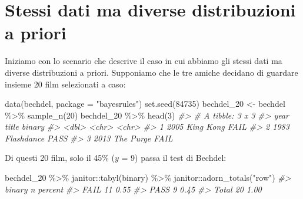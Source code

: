 \documentclass[
  11pt,
]{krantz}
\makeatletter
\newenvironment{Shaded}{\begin{snugshade}}{\end{snugshade}}
\newcommand{\AttributeTok}[1]{\textcolor[rgb]{0.61,0.61,0.61}{#1}}
\newcommand{\CommentTok}[1]{\textcolor[rgb]{0.37,0.37,0.37}{\textit{#1}}}
\newcommand{\DecValTok}[1]{\textcolor[rgb]{0.06,0.06,0.06}{#1}}
\newcommand{\FunctionTok}[1]{\textcolor[rgb]{0,0,0}{#1}}
\newcommand{\NormalTok}[1]{#1}
\newcommand{\OtherTok}[1]{\textcolor[rgb]{0.37,0.37,0.37}{#1}}
\newcommand{\SpecialCharTok}[1]{\textcolor[rgb]{0,0,0}{#1}}
\newcommand{\StringTok}[1]{\textcolor[rgb]{0.5,0.5,0.5}{#1}}
\newenvironment{kframe}{%
\medskip{}
\setlength{\fboxsep}{.8em}
 \def\at@end@of@kframe{}%
 \ifinner\ifhmode%
  \def\at@end@of@kframe{\end{minipage}}%
  \begin{minipage}{\columnwidth}%
 \fi\fi%
 \def\FrameCommand##1{\hskip\@totalleftmargin \hskip-\fboxsep
 \colorbox{shadecolor}{##1}\hskip-\fboxsep
     \hskip-\linewidth \hskip-\@totalleftmargin \hskip\columnwidth}%
 \MakeFramed {\advance\hsize-\width
   \@totalleftmargin\z@ \linewidth\hsize
   \@setminipage}}%
 {\par\unskip\endMakeFramed%
 \at@end@of@kframe}
\renewenvironment{Shaded}{\begin{kframe}}{\end{kframe}}
\theoremstyle{definition}
\theoremstyle{definition}
\theoremstyle{definition}
\theoremstyle{definition}
\theoremstyle{remark}
\makeatother
\begin{document}
\hypertarget{stessi-dati-ma-diverse-distribuzioni-a-priori}{%
\section{Stessi dati ma diverse distribuzioni a priori}\label{stessi-dati-ma-diverse-distribuzioni-a-priori}}

Iniziamo con lo scenario che descrive il caso in cui abbiamo gli stessi dati ma diverse distribuzioni a priori. Supponiamo che le tre amiche decidano di guardare insieme 20 film selezionati a caso:

\begin{Shaded}
\begin{Highlighting}[]
\FunctionTok{data}\NormalTok{(bechdel, }\AttributeTok{package =} \StringTok{"bayesrules"}\NormalTok{)}
\FunctionTok{set.seed}\NormalTok{(}\DecValTok{84735}\NormalTok{)}
\NormalTok{bechdel\_20 }\OtherTok{\textless{}{-}}\NormalTok{ bechdel }\SpecialCharTok{\%\textgreater{}\%} 
  \FunctionTok{sample\_n}\NormalTok{(}\DecValTok{20}\NormalTok{)}
\NormalTok{bechdel\_20 }\SpecialCharTok{\%\textgreater{}\%} 
  \FunctionTok{head}\NormalTok{(}\DecValTok{3}\NormalTok{)}
\CommentTok{\#\textgreater{} \# A tibble: 3 x 3}
\CommentTok{\#\textgreater{}    year title      binary}
\CommentTok{\#\textgreater{}   \textless{}dbl\textgreater{} \textless{}chr\textgreater{}      \textless{}chr\textgreater{} }
\CommentTok{\#\textgreater{} 1  2005 King Kong  FAIL  }
\CommentTok{\#\textgreater{} 2  1983 Flashdance PASS  }
\CommentTok{\#\textgreater{} 3  2013 The Purge  FAIL}
\end{Highlighting}
\end{Shaded}

\noindent Di questi 20 film, solo il 45\% (\(y\) = 9) passa il test di Bechdel:

\begin{Shaded}
\begin{Highlighting}[]
\NormalTok{bechdel\_20 }\SpecialCharTok{\%\textgreater{}\%} 
\NormalTok{  janitor}\SpecialCharTok{::}\FunctionTok{tabyl}\NormalTok{(binary) }\SpecialCharTok{\%\textgreater{}\%} 
\NormalTok{  janitor}\SpecialCharTok{::}\FunctionTok{adorn\_totals}\NormalTok{(}\StringTok{"row"}\NormalTok{)}
\CommentTok{\#\textgreater{}  binary  n percent}
\CommentTok{\#\textgreater{}    FAIL 11    0.55}
\CommentTok{\#\textgreater{}    PASS  9    0.45}
\CommentTok{\#\textgreater{}   Total 20    1.00}
\end{Highlighting}
\end{Shaded}
\end{document}
